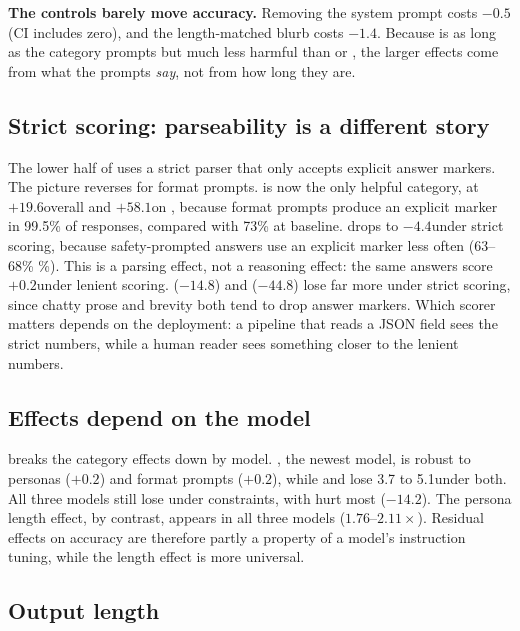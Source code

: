 {\bf The controls barely move accuracy.} Removing the system prompt costs $-0.5$\pp (CI includes zero), and the length-matched \neutrallong blurb costs $-1.4$\pp. Because \neutrallong is as long as the category prompts but much less harmful than \persona or \constraint, the larger effects come from what the prompts {\em say}, not from how long they are.

\subsection{Strict scoring: parseability is a different story}
\label{sec:strict}

The lower half of  uses a strict parser that only accepts explicit answer markers. The picture reverses for format prompts. \format is now the only helpful category, at $+19.6$\pp overall and $+58.1$\pp on \drop, because format prompts produce an explicit marker in 99.5\% of responses, compared with 73\% at baseline. \safety drops to $-4.4$\pp under strict scoring, because safety-prompted answers use an explicit marker less often (63--68\% \%). This is a parsing effect, not a reasoning effect: the same answers score $+0.2$\pp under lenient scoring. \persona ($-14.8$\pp) and \constraint ($-44.8$\pp) lose far more under strict scoring, since chatty prose and brevity both tend to drop answer markers. Which scorer matters depends on the deployment: a pipeline that reads a JSON field sees the strict numbers, while a human reader sees something closer to the lenient numbers.

\subsection{Effects depend on the model}
\label{sec:per_model}



 breaks the category effects down by model. \qwenthree, the newest model, is robust to personas ($+0.2$\pp) and format prompts ($+0.2$\pp), while \llama and \qwentwo lose 3.7 to 5.1\pp under both. All three models still lose under constraints, with \qwentwo hurt most ($-14.2$\pp). The persona length effect, by contrast, appears in all three models ($1.76$--$2.11\times$). Residual effects on accuracy are therefore partly a property of a model's instruction tuning, while the length effect is more universal.

\subsection{Output length}
\label{sec:length}


